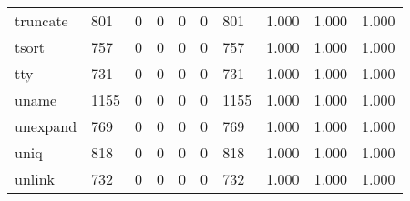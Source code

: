 \begin{longtable}{lp{1.3cm}p{1.3cm}p{1.3cm}p{1.3cm}p{1.3cm}p{1.3cm}p{1.3cm}p{1.3cm}p{1.3cm}}
truncate  &                    801 &                                  0 &                                 0 &                                0 &                                 0 &                             801 &                                1.000 &                                  1.000 &                                1.000 \\
tsort     &                    757 &                                  0 &                                 0 &                                0 &                                 0 &                             757 &                                1.000 &                                  1.000 &                                1.000 \\
tty       &                    731 &                                  0 &                                 0 &                                0 &                                 0 &                             731 &                                1.000 &                                  1.000 &                                1.000 \\
uname     &                   1155 &                                  0 &                                 0 &                                0 &                                 0 &                            1155 &                                1.000 &                                  1.000 &                                1.000 \\
unexpand  &                    769 &                                  0 &                                 0 &                                0 &                                 0 &                             769 &                                1.000 &                                  1.000 &                                1.000 \\
uniq      &                    818 &                                  0 &                                 0 &                                0 &                                 0 &                             818 &                                1.000 &                                  1.000 &                                1.000 \\
unlink    &                    732 &                                  0 &                                 0 &                                0 &                                 0 &                             732 &                                1.000 &                                  1.000 &                                1.000 \\

\end{longtable}
